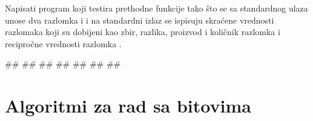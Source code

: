 \begin{Exercise}[label=004]
Napisati program koji testira prethodne funkcije tako što se sa standardnog ulaza unose dva razlomka  i  i na standardni izlaz se ispisuju skraćene vrednosti razlomaka koji su dobijeni kao zbir, razlika, proizvod i količnik razlomka  i recipročne vrednosti razlomka .

\begin{maxitest}
\begin{upotreba}{1}
#\naslovInt#
##
##
##
##
##
##
\end{upotreba}
\end{maxitest}



\end{Exercise}

\section{Algoritmi za rad sa bitovima}

